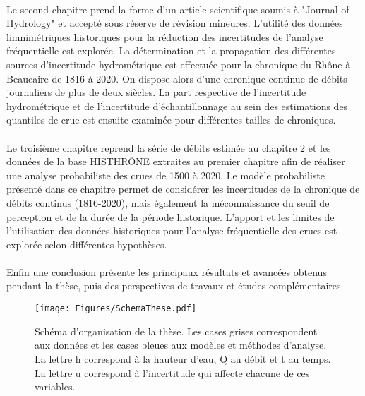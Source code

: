 \documentclass[11pt]{article}
\begin{document}
	\paragraph{} Le second chapitre prend la forme d'un article scientifique soumis à "Journal of Hydrology" et accepté sous réserve de révision mineures. L'utilité des données limnimétriques historiques pour la réduction des incertitudes de l'analyse fréquentielle est explorée. La détermination et la propagation des différentes sources d'incertitude hydrométrique est effectuée pour la chronique du Rhône à Beaucaire de 1816 à 2020. On dispose alors d'une chronique continue de débits journaliers de plus de deux siècles. La part respective de l'incertitude hydrométrique et de l'incertitude d'échantillonnage au sein des estimations des quantiles de crue est ensuite examinée pour différentes tailles de chroniques. 
	
	\paragraph{} Le troisième chapitre reprend la série de débits estimée au chapitre 2 et les données de la base HISTHRÔNE extraites au premier chapitre afin de réaliser une analyse probabiliste des crues de 1500 à 2020. Le modèle probabiliste présenté dans ce chapitre permet de considérer les incertitudes de la chronique de débits continus (1816-2020), mais également la méconnaissance du seuil de perception et de la durée de la période historique. L'apport et les limites de l'utilisation des données historiques pour l'analyse fréquentielle des crues est explorée selon différentes hypothèses. 
	
	\paragraph{} Enfin une conclusion présente les principaux résultats et avancées obtenus pendant la thèse, puis des perspectives de travaux et études complémentaires.
	

\begin{figure}[h]
	\centering
	\texttt{[image: Figures/SchemaThese.pdf]}	
	\caption{Schéma d'organisation de la thèse. Les cases grises correspondent aux données et les cases bleues aux modèles et méthodes d'analyse. La lettre h correspond à la hauteur d'eau, Q au débit et t au temps. La lettre u correspond à l'incertitude qui affecte chacune de ces variables.}
	\label{fig:SchemaThese}
\end{figure}

\FloatBarrier

\newpage

\printbibliography
\end{document}
